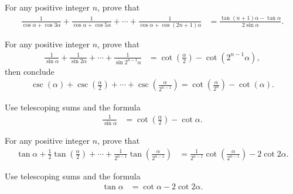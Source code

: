 \begin{question}
    For any positive integer $n$, prove that
    \begin{align*}
        \frac{1}{\cos \alpha +\cos 3\alpha}+\frac{1}{\cos \alpha + \cos 5\alpha}+\cdots+\frac{1}{\cos \alpha + \cos (2n+1)\alpha}&= \frac{\tan(n+1)\alpha - \tan\alpha}{2\sin \alpha}.
    \end{align*}
\end{question}




\begin{question}
    For any positive integer $n$, prove that
    \begin{align*}
        \frac{1}{\sin \alpha}+\frac{1}{\sin 2\alpha}+\cdots+\frac{1}{\sin 2^{n-1}\alpha}&= \cot\left(\frac{\alpha}{2}\right) - \cot\left(2^{n-1}\alpha\right),
    \end{align*}
    then conclude
    \begin{align*}
        \csc\left(\alpha\right)+\csc\left(\frac{\alpha}{2}\right)+\cdots+\csc\left(\frac{\alpha}{2^{n-1}}\right) = \cot\left(\frac{\alpha}{2^{n}}\right) - \cot\left(\alpha\right).
    \end{align*}
\end{question}


\begin{solution}
    Use telescoping sums and the formula
    \begin{align*}
        \frac{1}{\sin \alpha} &= \cot\left(\frac{\alpha}{2}\right) - \cot\alpha. 
    \end{align*}
\end{solution}

\begin{question}
    For any positive integer $n$, prove that
    \begin{align*}
        \tan \alpha + \frac{1}{2}\tan\left(\frac{\alpha}{2}\right) + \cdots +  \frac{1}{2^{n-1}}\tan\left(\frac{\alpha}{2^{n-1}}\right) &= \frac{1}{2^{n-1}}\cot\left(\frac{\alpha}{2^{n-1}}\right) - 2 \cot 2\alpha.
    \end{align*}
\end{question}


\begin{solution}
    Use telescoping sums and the formula
    \begin{align*}
        \tan\alpha &= \cot \alpha - 2\cot 2\alpha.
    \end{align*}
\end{solution}


